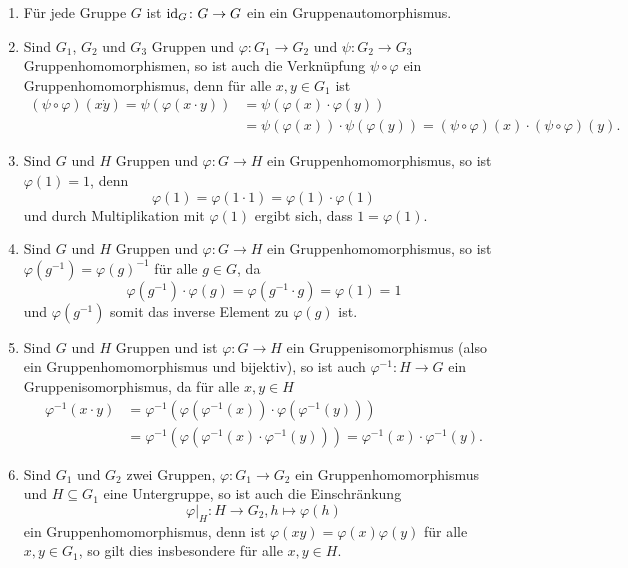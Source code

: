 \begin{bem}
 \begin{enumerate}[leftmargin=*]
  \item
   Für jede Gruppe $G$ ist $\mathrm{id}_G \colon G \to G$ ein ein Gruppenautomorphismus.
  \item
   Sind $G_1$, $G_2$ und $G_3$ Gruppen und $\varphi \colon G_1 \to G_2$ und $\psi \colon G_2 \to G_3$ Gruppenhomomorphismen, so ist auch die Verknüpfung $\psi \circ \varphi$ ein Gruppenhomomorphismus, denn für alle $x,y \in G_1$ ist
   \begin{align*}
    (\psi \circ \varphi)(x \dot y)
    = \psi(\varphi(x \cdot y))
    &= \psi(\varphi(x) \cdot \varphi(y)) \\
    &= \psi(\varphi(x)) \cdot \psi(\varphi(y))
    = (\psi \circ \varphi)(x) \cdot (\psi \circ \varphi)(y).
   \end{align*}
  \item
   Sind $G$ und $H$ Gruppen und $\varphi \colon G \to H$ ein Gruppenhomomorphismus, so ist $\varphi(1) = 1$, denn
   \[
    \varphi(1)
    = \varphi(1 \cdot 1)
    = \varphi(1) \cdot \varphi(1)
   \]
   und durch Multiplikation mit $\varphi(1)$ ergibt sich, dass $1 = \varphi(1)$.
  \item
   Sind $G$ und $H$ Gruppen und $\varphi \colon G \to H$ ein Gruppenhomomorphismus, so ist $\varphi(g^{-1}) = \varphi(g)^{-1}$ für alle $g \in G$, da
   \[
    \varphi(g^{-1}) \cdot \varphi(g)
    = \varphi(g^{-1} \cdot g)
    = \varphi(1)
    = 1
   \]
   und $\varphi(g^{-1})$ somit das inverse Element zu $\varphi(g)$ ist.
  \item
   Sind $G$ und $H$ Gruppen und ist $\varphi \colon G \to H$ ein Gruppenisomorphismus (also ein Gruppenhomomorphismus und bijektiv), so ist auch $\varphi^{-1} \colon H \to G$ ein Gruppenisomorphismus, da für alle $x,y \in H$
   \begin{align*}
    \varphi^{-1}(x \cdot y)
    &= \varphi^{-1}( \varphi(\varphi^{-1}(x)) \cdot \varphi(\varphi^{-1}(y)) ) \\
    &= \varphi^{-1}( \varphi( \varphi^{-1}(x) \cdot \varphi^{-1}(y) ) )
    = \varphi^{-1}(x) \cdot \varphi^{-1}(y).
   \end{align*}
  \item
   Sind $G_1$ und $G_2$ zwei Gruppen, $\varphi \colon G_1 \to G_2$ ein Gruppenhomomorphismus und $H \subseteq G_1$ eine Untergruppe, so ist auch die Einschränkung
   \[
    \varphi|_{H} \colon H \to G_2, h \mapsto \varphi(h)
   \]
   ein Gruppenhomomorphismus, denn ist $\varphi(xy) = \varphi(x)\varphi(y)$ für alle $x,y \in G_1$, so gilt dies insbesondere für alle $x,y \in H$.
 \end{enumerate}
\end{bem}


